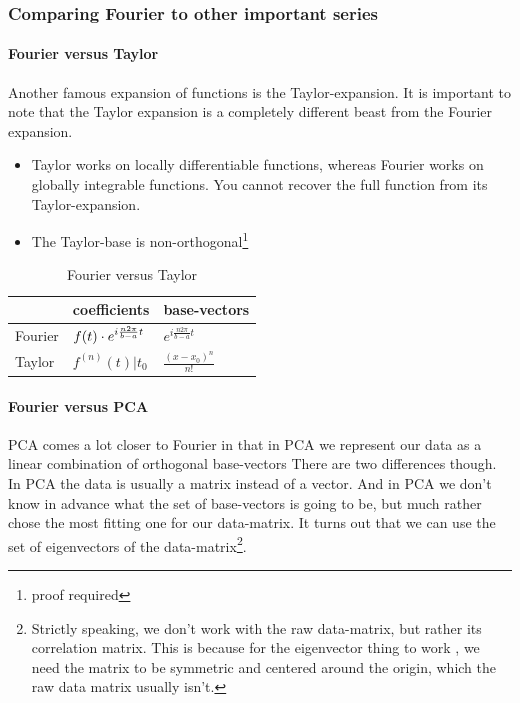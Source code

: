 \subsubsection{Comparing Fourier to other important series}

\paragraph{Fourier versus Taylor} Another famous expansion of functions is the Taylor-expansion.
It is important to note that the Taylor expansion is a completely different beast from the Fourier expansion.

\begin{itemize}
    \item Taylor works on locally differentiable functions, whereas Fourier works on globally integrable functions. 
    You cannot recover the full function from its Taylor-expansion.
    \item The Taylor-base is non-orthogonal\footnote{proof required}
\end{itemize}

\begin{table}[ht]
\centering
\caption{Fourier versus Taylor}
\begin{tabular}{@{}lll@{}}
\toprule
        & coefficients                                              & base-vectors                      \\ \midrule
Fourier & $f(t) \cdot e^{i \frac{n 2 \pi}{b-a} t}$             & $e^{i \frac{n 2 \pi}{b-a}  t}$    \\
Taylor  & $f^{(n)}(t)|t_0$                                          & $\frac{(x- x_0)^n}{n!}$          
\end{tabular}
\end{table}

\paragraph{Fourier versus PCA} PCA comes a lot closer to Fourier in that in PCA we represent our data as a linear combination of orthogonal base-vectors
 There are two differences though. In PCA the data is usually a matrix instead of a vector. And in PCA we don't know in advance
 what the set of base-vectors is going to be, but much rather chose the most fitting one for our data-matrix.
 It turns out that we can use the set of eigenvectors of the data-matrix\footnote{Strictly speaking, we don't work with the raw data-matrix, but rather its correlation matrix.
 This is because for the eigenvector thing to work , we need the matrix to be symmetric and centered around the origin, which the raw data matrix usually isn't.}.

